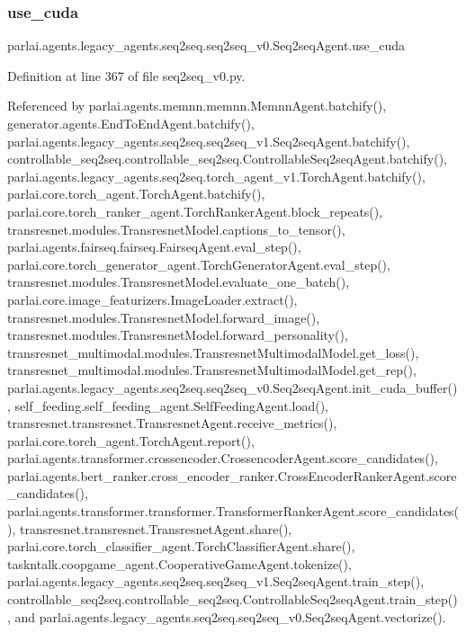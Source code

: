 \subsubsection{\texorpdfstring{use\+\_\+cuda}{use\_cuda}}
{\footnotesize\ttfamily parlai.\+agents.\+legacy\+\_\+agents.\+seq2seq.\+seq2seq\+\_\+v0.\+Seq2seq\+Agent.\+use\+\_\+cuda}



Definition at line 367 of file seq2seq\+\_\+v0.\+py.



Referenced by parlai.\+agents.\+memnn.\+memnn.\+Memnn\+Agent.\+batchify(), generator.\+agents.\+End\+To\+End\+Agent.\+batchify(), parlai.\+agents.\+legacy\+\_\+agents.\+seq2seq.\+seq2seq\+\_\+v1.\+Seq2seq\+Agent.\+batchify(), controllable\+\_\+seq2seq.\+controllable\+\_\+seq2seq.\+Controllable\+Seq2seq\+Agent.\+batchify(), parlai.\+agents.\+legacy\+\_\+agents.\+seq2seq.\+torch\+\_\+agent\+\_\+v1.\+Torch\+Agent.\+batchify(), parlai.\+core.\+torch\+\_\+agent.\+Torch\+Agent.\+batchify(), parlai.\+core.\+torch\+\_\+ranker\+\_\+agent.\+Torch\+Ranker\+Agent.\+block\+\_\+repeats(), transresnet.\+modules.\+Transresnet\+Model.\+captions\+\_\+to\+\_\+tensor(), parlai.\+agents.\+fairseq.\+fairseq.\+Fairseq\+Agent.\+eval\+\_\+step(), parlai.\+core.\+torch\+\_\+generator\+\_\+agent.\+Torch\+Generator\+Agent.\+eval\+\_\+step(), transresnet.\+modules.\+Transresnet\+Model.\+evaluate\+\_\+one\+\_\+batch(), parlai.\+core.\+image\+\_\+featurizers.\+Image\+Loader.\+extract(), transresnet.\+modules.\+Transresnet\+Model.\+forward\+\_\+image(), transresnet.\+modules.\+Transresnet\+Model.\+forward\+\_\+personality(), transresnet\+\_\+multimodal.\+modules.\+Transresnet\+Multimodal\+Model.\+get\+\_\+loss(), transresnet\+\_\+multimodal.\+modules.\+Transresnet\+Multimodal\+Model.\+get\+\_\+rep(), parlai.\+agents.\+legacy\+\_\+agents.\+seq2seq.\+seq2seq\+\_\+v0.\+Seq2seq\+Agent.\+init\+\_\+cuda\+\_\+buffer(), self\+\_\+feeding.\+self\+\_\+feeding\+\_\+agent.\+Self\+Feeding\+Agent.\+load(), transresnet.\+transresnet.\+Transresnet\+Agent.\+receive\+\_\+metrics(), parlai.\+core.\+torch\+\_\+agent.\+Torch\+Agent.\+report(), parlai.\+agents.\+transformer.\+crossencoder.\+Crossencoder\+Agent.\+score\+\_\+candidates(), parlai.\+agents.\+bert\+\_\+ranker.\+cross\+\_\+encoder\+\_\+ranker.\+Cross\+Encoder\+Ranker\+Agent.\+score\+\_\+candidates(), parlai.\+agents.\+transformer.\+transformer.\+Transformer\+Ranker\+Agent.\+score\+\_\+candidates(), transresnet.\+transresnet.\+Transresnet\+Agent.\+share(), parlai.\+core.\+torch\+\_\+classifier\+\_\+agent.\+Torch\+Classifier\+Agent.\+share(), taskntalk.\+coopgame\+\_\+agent.\+Cooperative\+Game\+Agent.\+tokenize(), parlai.\+agents.\+legacy\+\_\+agents.\+seq2seq.\+seq2seq\+\_\+v1.\+Seq2seq\+Agent.\+train\+\_\+step(), controllable\+\_\+seq2seq.\+controllable\+\_\+seq2seq.\+Controllable\+Seq2seq\+Agent.\+train\+\_\+step(), and parlai.\+agents.\+legacy\+\_\+agents.\+seq2seq.\+seq2seq\+\_\+v0.\+Seq2seq\+Agent.\+vectorize().

